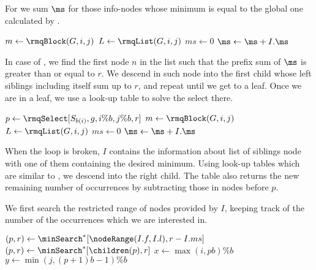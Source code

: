 For \rmqSizeBlock{} we sum $\ms$ for those info-nodes whose minimum is equal to the global one calculated by \rmq{}.

\begin{algorithm}
\begin{algorithmic}
		\State \Return{$\rmqSize[S_{b(i)}, g, i \% b, j \% b]$}
	\Else
		\State $m \gets \rmqBlock(G, i, j)$
		\State $L \gets \rmqList(G, i, j)$
		\State $ms \gets 0$
				\State $\ms \gets \ms + I.\ms$
			\EndIf
		\EndFor
		\State \Return{$\ms$}
	\EndIf
\EndFunction
\end{algorithmic}
\end{algorithm}

In case of \rmqSelect{}, we find the first node $n$ in the list such that the prefix sum of $\ms$ is greater than or equal to $r$.
We descend in such node into the first child whose left siblings including itself sum up to $r$, and repeat until we get to a leaf.
Once we are in a leaf, we use a look-up table to solve the select there.

\begin{algorithm}
\begin{algorithmic}
 
		\State $p \gets \rmqSelect[S_{b(i)}, g, i \% b, j \% b, r]$
		\State {}
	\Else
		\State $m \gets \rmqBlock(G, i, j)$
		\State $L \gets \rmqList(G, i, j)$
		\State $ms \gets 0$
					\State \Break
				\EndIf
				\State $\ms \gets \ms + I.\ms$
			\EndIf
		\EndFor
{}
\end{algorithmic}
\end{algorithm}

When the loop is broken, $I$ contains the information about list of siblings node with one of them containing the desired minimum.
Using look-up tables which are similar to \nodeSearch{}, we descend into the right child.
The table also returns the new remaining number of occurrences by subtracting those in nodes before $p$.

We first search the restricted range of nodes provided by $I$, keeping track of the number of the occurrences which we are interested in.

\begin{algorithm}
\begin{algorithmic}
		\State $(p, r) \gets \minSearch^*[\nodeRange(I.f, I.l), r - I.ms]$
			\State $(p, r) \gets \minSearch^*[\children(p), r]$
		\EndWhile
		\State $x \gets \max(i, p b) \% b$%
		\Instr $y \gets \min(j, (p + 1) b - 1) \% b$
		\State {}
	\EndIf
\EndFunction
\end{algorithmic}
\end{algorithm}


